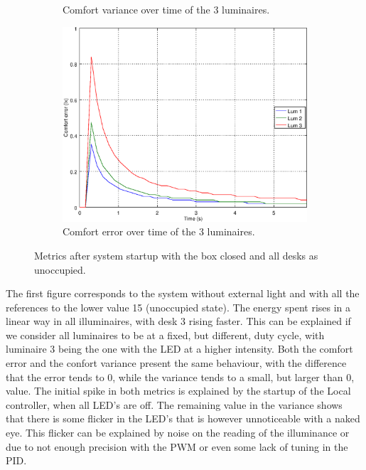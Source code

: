 \begin{figure}[ht]
\begin{subfigure}[t]{0.32\textwidth}
    \caption{Comfort variance over time of the 3 luminaires.}
    \label{fig:f_closed_o000}
    \end{subfigure}
    \begin{subfigure}[t]{0.32\textwidth}
    \centering
    \includegraphics[width=.95\textwidth]{img/n_closed_o000}
    \caption{Comfort error over time of the 3 luminaires.}
    \label{fig:n_closed_o000}
    \end{subfigure}
    \caption{Metrics after system startup with the box closed and all desks as unoccupied. }
    \label{fig:closed_o000}
\end{figure}

The first figure corresponds to the system without external light and with all the references to the lower value 15 (unoccupied state). The energy spent rises in a linear way in all illuminaires, with desk 3 rising faster. This can be explained if we consider all luminaires to be at a fixed, but different, duty cycle, with luminaire 3 being the one with the LED at a higher intensity. Both the comfort error and the confort variance present the same behaviour, with the difference that the error tends to 0, while the variance tends to a small, but larger than 0, value. The initial spike in both metrics is explained by the startup of the Local controller, when all LED's are off. The remaining value in the variance shows that there is some flicker in the LED's that is however unnoticeable with a naked eye. This flicker can be explained by noise on the reading of the illuminance or due to not enough precision with the PWM or even some lack of tuning in the PID.

